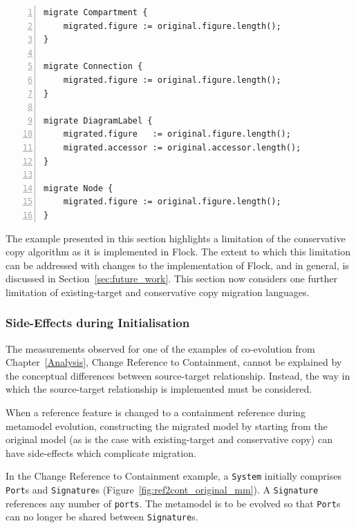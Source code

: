 \begin{lstlisting}[basicstyle=\ttfamily\footnotesize, flexiblecolumns=true, numbers=left, nolol=true, caption=Simplified GMF Graph model migration in Flock, label=lst:graph_flock, language=Flock, tabsize=2]
migrate Compartment {
	migrated.figure := original.figure.length();
}

migrate Connection {
	migrated.figure := original.figure.length();
}

migrate DiagramLabel {
	migrated.figure   := original.figure.length();
	migrated.accessor := original.accessor.length();
}

migrate Node {
	migrated.figure := original.figure.length();
}
\end{lstlisting}

The example presented in this section highlights a limitation of the conservative copy algorithm as it is implemented in Flock. The extent to which this limitation can be addressed with changes to the implementation of Flock, and in general, is discussed in Section~\ref{sec:future_work}. This section now considers one further limitation of existing-target and conservative copy migration languages.

\subsubsection{Side-Effects during Initialisation}
The measurements observed for one of the examples of co-evolution from Chapter~\ref{Analysis}, Change Reference to Containment, cannot be explained by the conceptual differences between source-target relationship. Instead, the way in which the source-target relationship is implemented must be considered.

When a reference feature is changed to a containment reference during metamodel evolution, constructing the migrated model by starting from the original model (as is the case with existing-target and conservative copy) can have side-effects which complicate migration.

In the Change Reference to Containment example, a \texttt{System} initially comprises \texttt{Port}s and \texttt{Signature}s (Figure~\ref{fig:ref2cont_original_mm}). A \texttt{Signature} references any number of \texttt{ports}. The metamodel is to be evolved so that \texttt{Port}s can no longer be shared between \texttt{Signature}s.

